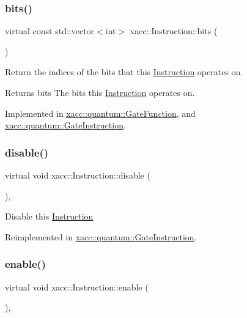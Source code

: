\subsubsection{\texorpdfstring{bits()}{bits()}}
{\footnotesize\ttfamily virtual const std\+::vector$<$int$>$ xacc\+::\+Instruction\+::bits (\begin{DoxyParamCaption}{ }\end{DoxyParamCaption})\hspace{0.3cm}{\ttfamily [pure virtual]}}

Return the indices of the bits that this \hyperlink{a02460}{Instruction} operates on.

\begin{DoxyReturn}{Returns}
bits The bits this \hyperlink{a02460}{Instruction} operates on. 
\end{DoxyReturn}


Implemented in \hyperlink{a01272_aba03de68b76a9e120705c3c389c714a1}{xacc\+::quantum\+::\+Gate\+Function}, and \hyperlink{a01276_ad32ad03dfc516e00093030e60178003d}{xacc\+::quantum\+::\+Gate\+Instruction}.

\mbox{\label{a02460_a6e528da15e05a94cc1d7db268c483271}} 
\subsubsection{\texorpdfstring{disable()}{disable()}}
{\footnotesize\ttfamily virtual void xacc\+::\+Instruction\+::disable (\begin{DoxyParamCaption}{ }\end{DoxyParamCaption})\hspace{0.3cm}{\ttfamily [inline]}, {\ttfamily [virtual]}}

Disable this \hyperlink{a02460}{Instruction} 

Reimplemented in \hyperlink{a01276_a63ce138dd71fb43d303f5600fefb7215}{xacc\+::quantum\+::\+Gate\+Instruction}.

\mbox{\label{a02460_a0b4f2e5a591af28342a3c08e4305e24f}} 
\subsubsection{\texorpdfstring{enable()}{enable()}}
{\footnotesize\ttfamily virtual void xacc\+::\+Instruction\+::enable (\begin{DoxyParamCaption}{ }\end{DoxyParamCaption})\hspace{0.3cm}{\ttfamily [inline]}, {\ttfamily [virtual]}}

